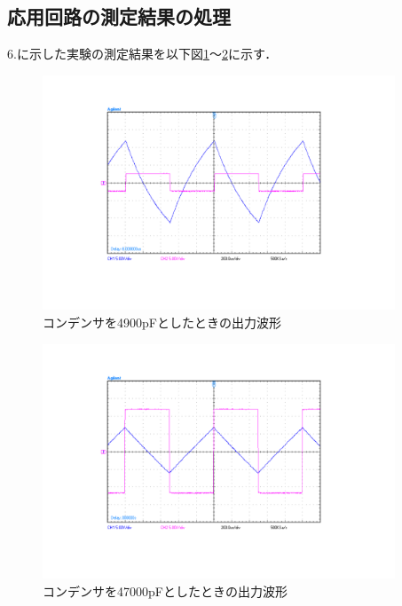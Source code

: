 \documentclass[10pt, a4j, dvipdfmx]{jarticle}
\makeatletter
\newcommand{\figcaption}[1]{\def\@captype{figure}\caption{#1}}
\makeatother
\begin{document}
\newpage
\subsection{応用回路の測定結果の処理}
6.に示した実験の測定結果を以下図\ref{fig:7-5-1}～\ref{fig:7-5-2}に示す．
\begin{figure}[H]
    \centering
    \includegraphics[height=70mm]{Result/Reverse/reverse-1kHz_4900pF.png}
    \figcaption{コンデンサを4900pFとしたときの出力波形}
    \label{fig:7-5-1}
\end{figure}
\begin{figure}[H]
    \centering
    \includegraphics[height=70mm]{Result/Reverse/reverse-1kHz_47000pF.png}
    \figcaption{コンデンサを47000pFとしたときの出力波形}
    \label{fig:7-5-2}
\end{figure}


\newpage
\end{document}
